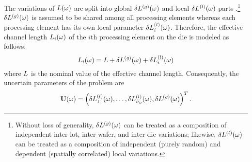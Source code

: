 
The variations of $L(\omega)$ are split into global ${\delta L^{(g)}}(\omega)$ and local $\delta L^{(l)}(\omega)$ parts \cite{chandra2010, shen2009}.\footnote{Without loss of generality, ${\delta L^{(g)}}(\omega)$ can be treated as a composition of independent inter-lot, inter-wafer, and inter-die variations; likewise, $\delta L^{(l)}(\omega)$ can be treated as a composition of independent (purely random) and dependent (spatially correlated) local variations.}
${\delta L^{(g)}}(\omega)$ is assumed to be shared among all processing elements whereas each processing element has its own local parameter $\delta L^{(l)}_i(\omega)$.
Therefore, the effective channel length $L_i(\omega)$ of the $i$th processing element on the die is modeled as follows:
\begin{equation} \elabel{leakage-partition}
  \Leff_i(\o) = \nLeff + \gLeff(\o) + \lLeff_i(\o)
\end{equation}
where $L$ is the nominal value of the effective channel length. Consequently, the uncertain parameters of the problem are
\begin{equation} \elabel{uncertain-parameters}
  \vU(\o) = \vec{\lLeff_1(\o), \dotsc, \lLeff_\nprocs(\o), \gLeff(\o) }.
\end{equation}

